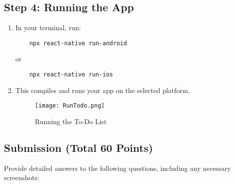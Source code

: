 \documentclass{article}
\begin{document}
\subsection{Step 4: Running the App}
\begin{enumerate}
    \item In your terminal, run:
    \begin{verbatim}
    npx react-native run-android
    \end{verbatim}
    or
    \begin{verbatim}
    npx react-native run-ios
    \end{verbatim}
    \item This compiles and runs your app on the selected platform.
    \begin{figure}[H]
        \centering
        \texttt{[image: RunTodo.png]}
        \caption{Running the To-Do List}
    \end{figure}

\end{enumerate}

\subsection{Submission (Total 60 Points)}
Provide detailed answers to the following questions, including any necessary screenshots:
\end{document}
